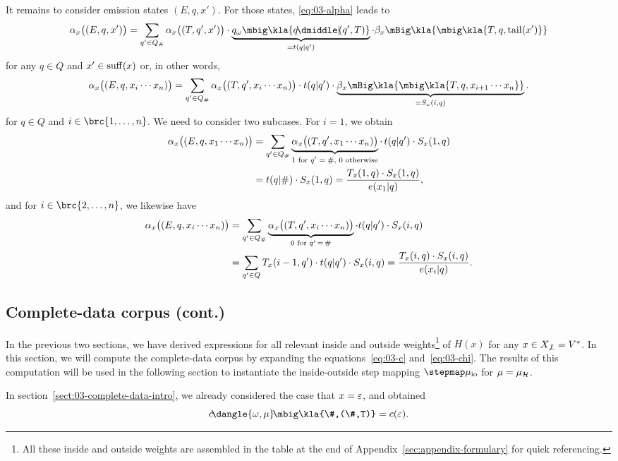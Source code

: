 It remains to consider emission states $(E,q,x')$. For those states, \eqref{eq:03-alpha} leads to
\[
 \alpha_x\doublekla{E,q,x'} = \sum_{q'\in Q_\#} \alpha_x\doublekla{T,q',x'} \cdot \underbrace{q_\omega\mbig\kla{q\npipe(q',T)}}_{=t(q|q')} \cdot \beta_x\mBig\kla{\mbig\kla{T,q,\cdr(x')}}
\]
for any $q\in Q$ and $x'\in\operatorname{suff}(x)$ or, in other words,
\[
 \alpha_x\doublekla{E,q,x_i\cdots x_n} = \sum_{q'\in Q_\#} \alpha_x\doublekla{T,q',x_i\cdots x_n} \cdot t(q|q') \cdot \underbrace{\beta_x\mBig\kla{\mbig\kla{T,q,x_{i+1}\cdots x_n}}}_{=S_x(i,q)}.
\]
for $q\in Q$ and $i\in\brc{1,\ldots,n}$. We need to consider two subcases. For $i=1$, we obtain
\begin{align*}
 \alpha_x\bigl((E,q,x_1\cdots x_n)\bigr)
 &= \sum_{q'\in Q_\#} \underbrace{\alpha_x\bigl((T,q',x_1\cdots x_n)\bigr)}_{\text{$1$ for $q'=\#$, $0$ otherwise}} \cdot\, t(q|q') \cdot S_x(1,q) \\
 &= t(q|\#) \cdot S_x(1,q)
 = \frac{T_x(1,q) \cdot S_x(1,q)}{e(x_1|q)},
\end{align*}
and for $i\in\brc{2,\ldots,n}$, we likewise have
\begin{align*}
 \alpha_x\bigl((E,q,x_i\cdots x_n)\bigr)
 &= \sum_{q'\in Q_\#} \underbrace{\alpha_x\bigl((T,q',x_i\cdots x_n)\bigr)}_{0\text{ for }q'\,=\,\#} \cdot t(q|q') \cdot S_x(i,q) \\
 &= \sum_{q'\in Q} T_x(i-1,q') \cdot t(q|q') \cdot S_x(i,q)
 = \frac{T_x(i,q) \cdot S_x(i,q)}{e(x_i|q)}.
\end{align*}
\clearpage

\subsection{Complete-data corpus (cont.)}\label{sect:03-complete-data}

In the previous two sections, we have derived expressions for all relevant
inside and outside weights\footnote{All these inside and outside weights are
assembled in the table at the end of Appendix~\ref{sec:appendix-formulary} for quick
referencing.} of $H(x)$ for any $x\in X_{\not\bot}=V^*$. In this section, we will
compute the complete-data corpus by expanding the equations~\eqref{eq:03-c}
and~\eqref{eq:03-chi}. The results of this computation will be used in the
following section to instantiate the inside-outside step mapping
$\stepmap\mu_\mathrm{io}$ for $\mu=\mu_\mathcal H$.

In section~\ref{sect:03-complete-data-intro}, we already considered the case
that $x=\varepsilon$, and obtained
\[
 c\!\dangle{\omega,\mu}\!\mbig\kla{\#,(\#,T)} = c(\eps).
\]

